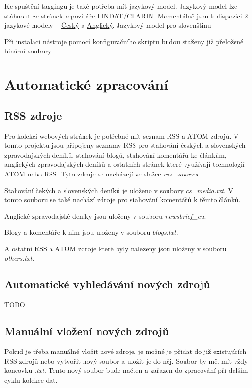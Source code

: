 Ke spuštění taggingu je také potřeba mít jazykový model. Jazykový model lze stáhnout
ze stránek repozitáře \href{https://lindat.mff.cuni.cz/repository/xmlui/}{LINDAT/CLARIN}.
Momentálně jsou k dispozici 2 jazykové modely -- \href{https://lindat.mff.cuni.cz/repository/xmlui/handle/11234/1-1836}{Český}
a \href{https://lindat.mff.cuni.cz/repository/xmlui/}{Anglický}. Jazykový model pro slovenštinu

Při instalaci nástroje pomocí konfiguračního skriptu budou staženy již přeložené binární
soubory.

\section{Automatické zpracování}

\subsection{RSS zdroje}
Pro kolekci webových stránek je potřebné mít seznam RSS a ATOM zdrojů. V tomto projektu
jsou připojeny seznamy RSS pro stahování českých a slovenských zpravodajských deníků, stahování blogů,
stahování komentářů ke článkům, anglických zpravodajských deníků a ostatních stránek které využívají
technologií ATOM nebo RSS. Tyto zdroje se nacházejí ve složce \textit{rss\_sources}.

Stahování čekých a slovenských deníků je uloženo v soubory \textit{cs\_media.txt}. V tomto souboru
se také nachází zdroje pro stahování komentářů k těmto článků.

Anglické zpravodajské deníky jsou uloženy v souboru \textit{newsbrief\_eu}.

Blogy a komentáře k nim jsou uloženy v souboru \textit{blogs.txt}.

A ostatní RSS a ATOM zdroje které byly nalezeny jsou uloženy v souboru \textit{others.txt}.

\subsection{Automatické vyhledávání nových zdrojů}
TODO

\subsection{Manuální vložení nových zdrojů}
Pokud je třeba manuálně vložit nové zdroje, je možné je přidat do již existujících
RSS zdrojů nebo vytvořit nový soubor a uložit je do něj. Soubor by měl mít vždy koncovku
\textit{.txt}. Tento nový soubor bude načten a zařazen do zpracování při dalším cyklu kolekce dat.

